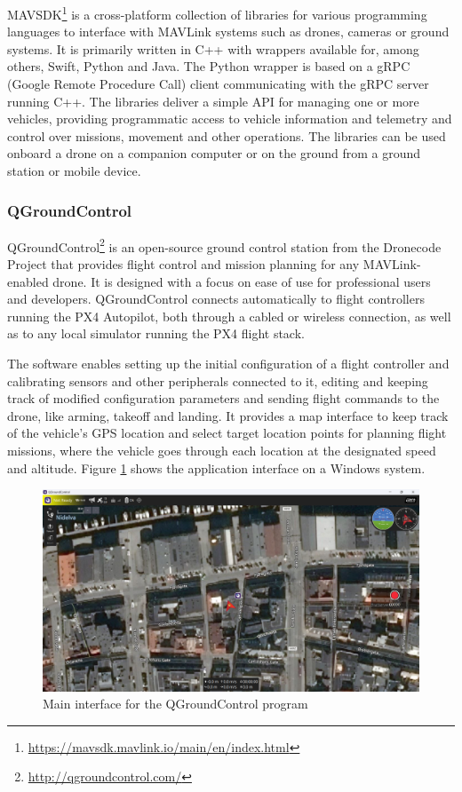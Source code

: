 MAVSDK\footnote{\url{https://mavsdk.mavlink.io/main/en/index.html}} is a cross-platform collection of libraries for various programming languages
to interface with MAVLink systems such as drones, cameras or ground systems.
It is primarily written in C++ with wrappers available for,
among others, Swift, Python and Java.
The Python wrapper is based on a gRPC (Google Remote Procedure Call) client communicating with the gRPC server running C++.
The libraries deliver a simple API for managing one or more vehicles, 
providing programmatic access to vehicle information and telemetry
and control over missions, movement and other operations.
The libraries can be used onboard a drone on a companion computer
or on the ground from a ground station or mobile device.


\subsubsection{QGroundControl}
\label{subsec:qgc}
QGroundControl\footnote{\url{http://qgroundcontrol.com/}} is an open-source ground control station from the Dronecode Project that provides flight control and mission planning for any MAVLink-enabled drone.
It is designed with a focus on ease of use for professional users and developers.
QGroundControl connects automatically to flight controllers running the PX4 Autopilot, both through a cabled or wireless connection, as well as to any local simulator running the PX4 flight stack.

The software enables setting up the initial configuration of a flight controller and calibrating sensors and other peripherals connected to it, editing and keeping track of modified configuration parameters and sending flight commands to the drone, like arming, takeoff and landing.
It provides a map interface to keep track of the vehicle's GPS location and select target location points for planning flight missions, where the vehicle goes through each location at the designated speed and altitude.
Figure \ref{fig:qgc-map} shows the application interface on a Windows system.

\begin{figure}
  \centering
  \includegraphics[width=\textwidth,keepaspectratio]{img/qgc-map.png}
  \caption{Main interface for the QGroundControl program}
  \label{fig:qgc-map}
\end{figure}

